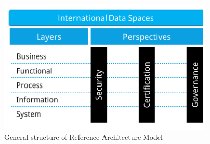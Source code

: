 
\begin{figure}[H]
	\begin{Center}
		\includegraphics[width=4.12in,height=2.58in]{./media/image11.png}
		\caption{ General structure of Reference Architecture Model}
		\label{fig:_General_structure_of_Reference_Architecture_Model}
	\end{Center}
\end{figure}


